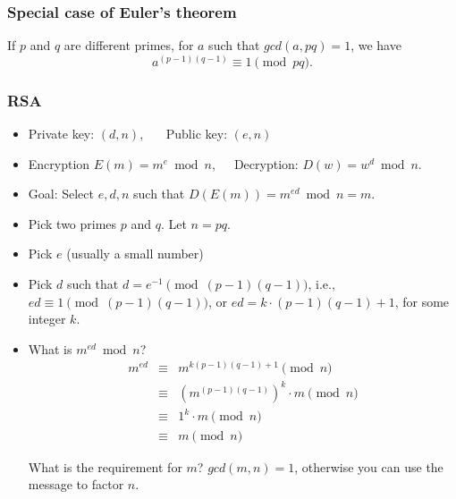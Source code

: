 \begin{frame}
  \frametitle{Special case of Euler's theorem}

  \begin{theorem}
    If $p$ and $q$ are different primes, for $a$ such that $gcd(a,pq)=1$, we have
    \[
    a^{(p-1)(q-1)} \equiv 1 \pmod{pq}.
    \]
  \end{theorem}

  \vspace{0.2in}
   
\end{frame}

\begin{frame}
  \frametitle{RSA}

  \begin{tcolorbox}
  {\footnotesize
  \begin{itemize}
  \item Private key: $(d,n)$, \ \ \  Public key: $(e,n)$
  \item Encryption $E(m) = m^{e} \bmod n$,\ \ \  Decryption: $D(w) = w^{d} \bmod n$.
  \item Goal: Select $e,d,n$ such that $D(E(m)) = m^{ed}\bmod n = m$.
  \end{itemize}
  }
  \end{tcolorbox}
  
  \vspace{0.1in}
  \pause
  {\footnotesize
  \begin{itemize}
  \item Pick two primes $p$ and $q$.  Let $n=pq$.
  \item Pick $e$ (usually a small number)
  \item Pick $d$ such that $d = e^{-1} \pmod{(p-1)(q-1)}$, i.e., $ed\equiv 1 \pmod{(p-1)(q-1)}$, or $ed = k\cdot(p-1)(q-1) + 1$, for some integer $k$.
  \item What is $m^{ed}\bmod n$? \pause
    \begin{eqnarray*}
      m^{ed} &\equiv& m^{k(p-1)(q-1)+1} \pmod n\\
      &\equiv& (m^{(p-1)(q-1)})^k\cdot m \pmod n\\
      &\equiv& 1^k\cdot m \pmod n\\
      &\equiv& m \pmod n
    \end{eqnarray*}
    \pause

    What is the requirement for $m$?  \pause $gcd(m,n)=1$, otherwise
    you can use the message to factor $n$.
  \end{itemize}
  }
  \vspace{0.5in}
\end{frame}
